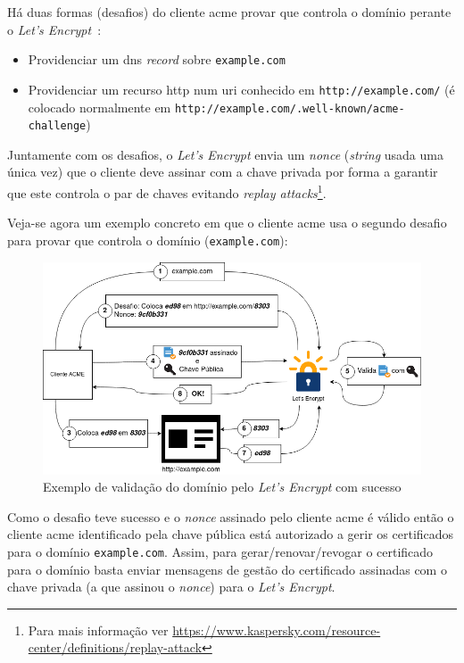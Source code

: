 Há duas formas (desafios) do cliente \acrshort{acme} provar que controla o domínio perante o \textit{Let's Encrypt}~\cite{domainValidation}:
\begin{itemize}
    \item Providenciar um \acrshort{dns} \textit{record} sobre \texttt{example.com}
    \item Providenciar um recurso \acrshort{http} num \acrshort{uri} conhecido em \texttt{http://example.com/} (é colocado normalmente em \texttt{http://example.com/.well-known/acme-challenge})
\end{itemize}

Juntamente com os desafios, o \textit{Let's Encrypt} envia um \textit{nonce} (\textit{string} usada uma única vez) que o cliente deve assinar com a chave privada por forma a garantir que este controla o par de chaves evitando \textit{replay attacks}\footnote{Para mais informação ver \url{https://www.kaspersky.com/resource-center/definitions/replay-attack}}.

Veja-se agora um exemplo concreto em que o cliente \acrshort{acme} usa o segundo desafio para provar que controla o domínio (\texttt{example.com}):

\begin{figure}[H]
    \begin{center}
        \includegraphics[width=1\textwidth]{img/domainValidation.png}
    \end{center}
    \caption{Exemplo de validação do domínio pelo \textit{Let's Encrypt} com sucesso}
\end{figure}

Como o desafio teve sucesso e o \textit{nonce} assinado pelo cliente \acrshort{acme} é válido então o cliente \acrshort{acme} identificado pela chave pública está autorizado a gerir os certificados para o domínio \texttt{example.com}. Assim, para gerar/renovar/revogar o certificado para o domínio basta enviar mensagens de gestão do certificado assinadas com o chave privada (a que assinou o \textit{nonce}) para o \textit{Let's Encrypt}.

